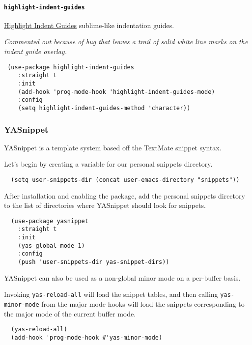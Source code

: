 \documentclass[11pt]{article}
\begin{document}
\paragraph*{\texttt{highlight-indent-guides}}
\label{sec:orgb53e383}
\href{https://github.com/darthfennec/highlight-indent-guides}{Highlight Indent Guides} sublime-like indentation guides.

\emph{Commented out because of bug that leaves a trail of solid white line marks on the indent guide overlay.}

\begin{verbatim}
 (use-package highlight-indent-guides
    :straight t
    :init
    (add-hook 'prog-mode-hook 'highlight-indent-guides-mode)
    :config
    (setq highlight-indent-guides-method 'character))
\end{verbatim}

\subsubsection*{YASnippet}
\label{sec:org28909e9}

YASnippet is a template system based off the TextMate snippet syntax.

Let's begin by creating a variable for our personal snippets directory.

\begin{verbatim}
  (setq user-snippets-dir (concat user-emacs-directory "snippets"))
\end{verbatim}

After installation and enabling the package, add the personal snippets
directory to the list of directories where YASnippet should look for snippets.

\begin{verbatim}
  (use-package yasnippet
    :straight t
    :init
    (yas-global-mode 1)
    :config
    (push 'user-snippets-dir yas-snippet-dirs))
\end{verbatim}

YASnippet can also be used as a non-global minor mode on a per-buffer
basis.

Invoking \texttt{yas-reload-all} will load the snippet tables, and then
calling \texttt{yas-minor-mode} from the major mode hooks will load the
snippets corresponding to the major mode of the current buffer mode.

\begin{verbatim}
  (yas-reload-all)
  (add-hook 'prog-mode-hook #'yas-minor-mode)
\end{verbatim}
\end{document}
